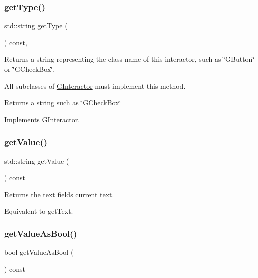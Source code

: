 \subsubsection{\texorpdfstring{get\+Type()}{getType()}}
{\footnotesize\ttfamily std\+::string get\+Type (\begin{DoxyParamCaption}{ }\end{DoxyParamCaption}) const\hspace{0.3cm}{\ttfamily [override]}, {\ttfamily [virtual]}}



Returns a string representing the class name of this interactor, such as \char`\"{}\+G\+Button\char`\"{} or \char`\"{}\+G\+Check\+Box\char`\"{}. 

All subclasses of \mbox{\hyperlink{classsgl_1_1GInteractor}{G\+Interactor}} must implement this method. \begin{DoxyReturn}{Returns}
a string such as \char`\"{}\+G\+Check\+Box\char`\"{} 
\end{DoxyReturn}


Implements \mbox{\hyperlink{classsgl_1_1GInteractor_a44c407a54a20dd0f2fff30338289299d}{G\+Interactor}}.

\mbox{\label{classsgl_1_1GTextField_a2a03038d2e299f486e55dc72778f7086}} 
\subsubsection{\texorpdfstring{get\+Value()}{getValue()}}
{\footnotesize\ttfamily std\+::string get\+Value (\begin{DoxyParamCaption}{ }\end{DoxyParamCaption}) const\hspace{0.3cm}{\ttfamily [virtual]}}



Returns the text field\textquotesingle{}s current text. 

Equivalent to get\+Text. \mbox{\label{classsgl_1_1GTextField_a8190c918ce29007223898c9d511b17ee}} 
\subsubsection{\texorpdfstring{get\+Value\+As\+Bool()}{getValueAsBool()}}
{\footnotesize\ttfamily bool get\+Value\+As\+Bool (\begin{DoxyParamCaption}{ }\end{DoxyParamCaption}) const\hspace{0.3cm}{\ttfamily [virtual]}}



